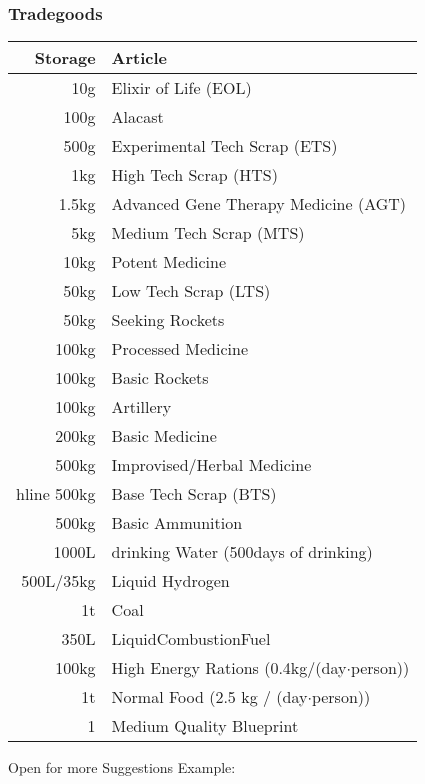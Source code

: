 \documentclass{article}
\begin{document}
    \subsubsection{Tradegoods}
    \begin{tabular}{|r|l|}
        \hline
        Storage & Article\\\hline
         10g & Elixir of Life (EOL)\\\hline
        100g & Alacast\\\hline
        500g & Experimental Tech Scrap (ETS)\\\hline
        1kg & High Tech Scrap (HTS)\\\hline
        1.5kg & Advanced Gene Therapy Medicine (AGT)\\\hline
        5kg & Medium Tech Scrap (MTS)\\\hline
        10kg & Potent Medicine\\\hline
        50kg & Low Tech Scrap (LTS)\\\hline
        50kg & Seeking Rockets\\\hline
        100kg & Processed Medicine\\\hline
        100kg & Basic Rockets\\\hline
        100kg & Artillery\\\hline
        200kg & Basic Medicine\\\hline
        500kg & Improvised/Herbal Medicine\\hline
        500kg & Base Tech Scrap (BTS)\\\hline
        500kg & Basic Ammunition\\\hline
        1000L & drinking Water (500days of drinking)\\\hline
        500L/35kg & Liquid Hydrogen\\\hline
        1t & Coal\\\hline
        350L & LiquidCombustionFuel\\\hline
        100kg & High Energy Rations (0.4kg/(day\(\cdot\)person))\\\hline
        1t & Normal Food (2.5 kg / (day\(\cdot\)person))\\\hline
        1 & Medium Quality Blueprint\\\hline

    \end{tabular}\par
    Open for more Suggestions\newline
    \newline
    Example:\par
\end{document}
